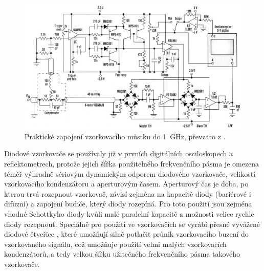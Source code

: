 \begin{figure}[htbp]\includegraphics[width=\textwidth,keepaspectratio]{images/oscilloscopefrontend.png}\caption{Praktické zapojení vzorkovacího můstku do \SI{1}{\giga\hertz}, převzato z \cite{oscilloscopefrontend}.}\label{oscilloscopefrontend}\end{figure}		

Diodové vzorkovače se používaly již v prvních digitálních osciloskopech a reflektometrech, protože jejich šířka použitelného frekvenčního pásma je omezena téměř výhradně sériovým dynamickým odporem diodového vzorkovače, velikostí vzorkovacího kondenzátoru a aperturovým časem. Aperturový čas je doba, po kterou trvá rozepnout vzorkovač, závisí zejména na kapacitě diody (bariérové i difuzní) a zapojení budiče, který diody rozepíná. Pro toto použití jsou zejména vhodné Schottkyho diody kvůli malé paralelní kapacitě a možnosti velice rychle diody rozepnout. Speciálně pro použití ve vzorkovačích se vyrábí přesné vyvážené diodové čtveřice \cite{HSMS282xdatasheet}, které umožňují silně potlačit průnik vzorkovacího buzení do vzorkovaného signálu, což umožňuje použití velmi malých vzorkovacích kondenzátorů, a tedy velkou šířku užitečného frekvenčního pásma takového vzorkovače.
	